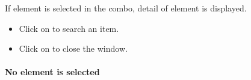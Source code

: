\documentclass[letterpaper,10pt,english]{sphinxmanual}
\begin{document}
If element is selected in the combo, detail of element is displayed.
\begin{figure}[htbp]
\centering

\end{figure}
\begin{itemize}
\item {} 
Click on  to search an item.

\item {} 
Click on  to close the window.

\end{itemize}
\newpage\paragraph{No element is selected}
\end{document}
